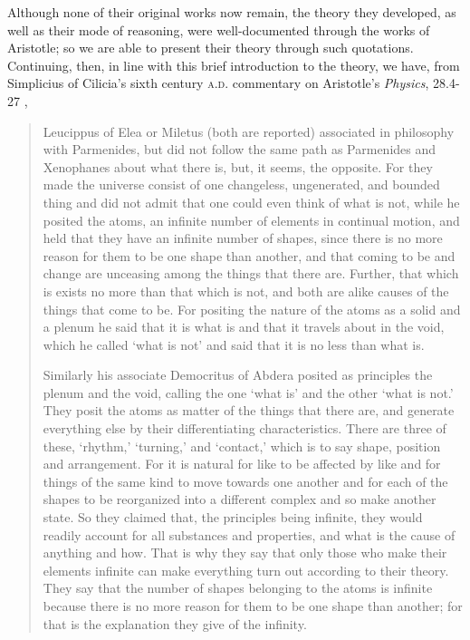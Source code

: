 Although none of their original works now remain, the theory they developed, as well as their mode of reasoning, were well-documented through the works of Aristotle; so we are able to present their theory through such quotations. Continuing, then, in line with this brief introduction to the theory, we have, from Simplicius of Cilicia's sixth century \textsc{a.d.} commentary on Aristotle's \textit{Physics}, 28.4-27 \cite{Taylor1999},
\begin{quotation}
Leucippus of Elea or Miletus (both are reported) associated in philosophy with Parmenides, but did not follow the same path as Parmenides and Xenophanes about what there is, but, it seems, the opposite. For they made the universe consist of one changeless, ungenerated, and bounded thing and did not admit that one could even think of what is not, while he posited the atoms, an infinite number of elements in continual motion, and held that they have an infinite number of shapes, since there is no more reason for them to be one shape than another, and that coming to be and change are unceasing among the things that there are. Further, that which is exists no more than that which is not, and both are alike causes of the things that come to be. For positing the nature of the atoms as a solid and a plenum he said that it is what is and that it travels about in the void, which he called `what is not' and said that it is no less than what is.

Similarly his associate Democritus of Abdera posited as principles the plenum and the void, calling the one `what is' and the other `what is not.' They posit the atoms as matter of the things that there are, and generate everything else by their differentiating characteristics. There are three of these, `rhythm,' `turning,' and `contact,' which is to say shape, position and arrangement. For it is natural for like to be affected by like and for things of the same kind to move towards one another and for each of the shapes to be reorganized into a different complex and so make another state. So they claimed that, the principles being infinite, they would readily account for all substances and properties, and what is the cause of anything and how. That is why they say that only those who make their elements infinite can make everything turn out according to their theory. They say that the number of shapes belonging to the atoms is infinite because there is no more reason for them to be one shape than another; for that is the explanation they give of the infinity.
\end{quotation}

